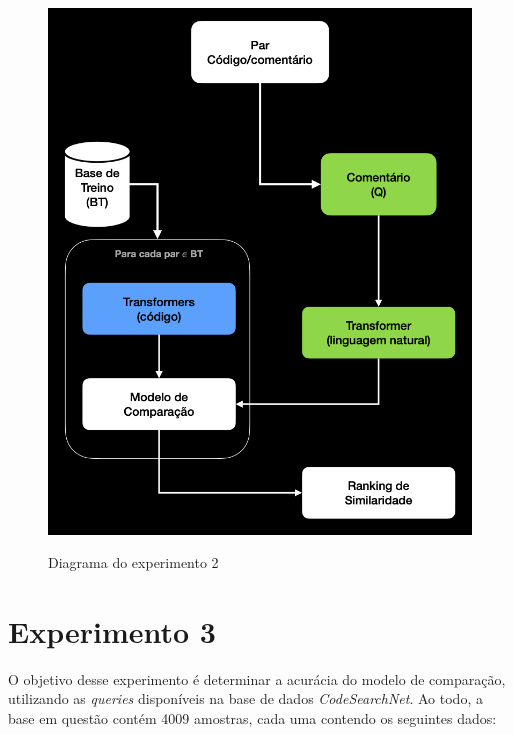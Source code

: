 \begin{figure}[H]
    \centering
        \caption{Diagrama do experimento 2}
        \includegraphics[scale=0.5]{imagens/proposta-experimental/experiment-2.png}
        \label{fig:experiment-2-diagram}
\end{figure}

\section{Experimento 3}
\label{sec:experiments:experiment-3}
O objetivo desse experimento é determinar a acurácia do modelo de comparação, utilizando as \textit{queries} disponíveis na base de dados \textit{CodeSearchNet}. Ao todo, a base em questão contém 4009 amostras, cada uma contendo os seguintes dados:

